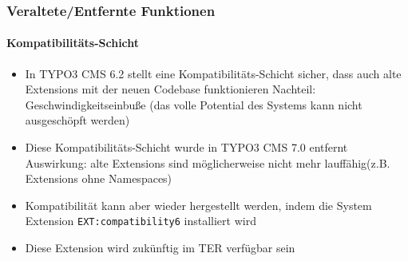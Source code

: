 %

\begin{frame}[fragile]
	\frametitle{Veraltete/Entfernte Funktionen}
	\framesubtitle{Kompatibilitäts-Schicht}

	\begin{itemize}

		\item In TYPO3 CMS 6.2 stellt eine Kompatibilitäts-Schicht sicher,
			dass auch alte Extensions mit der neuen Codebase funktionieren\newline
			\small
				Nachteil: Geschwindigkeitseinbuße (das volle Potential des Systems kann nicht ausgeschöpft werden)
			\normalsize

		\item Diese Kompatibilitäts-Schicht wurde in TYPO3 CMS 7.0 entfernt\newline
			\small
				Auswirkung: alte Extensions sind möglicherweise nicht mehr lauffähig\newline(z.B. Extensions ohne Namespaces)
			\normalsize

		\item Kompatibilität kann aber wieder hergestellt werden, indem die System Extension \texttt{EXT:compatibility6} installiert wird
		\item Diese Extension wird zukünftig im TER verfügbar sein

	\end{itemize}

\end{frame}


